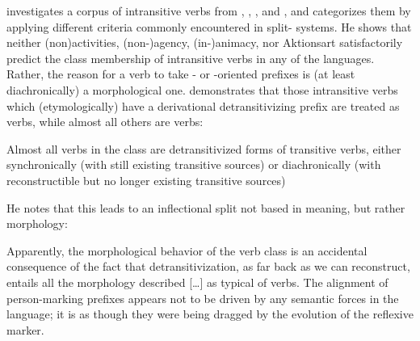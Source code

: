 \textcite{meira2000split} investigates a corpus of intransitive verbs from \trio, \kalina, \apalai, and \wayana, and categorizes them by applying different criteria commonly encountered in split- systems.
He shows that neither (non\-)activities, %
(non-)agency, %
(in-)animacy, %
nor Aktionsart %
satisfactorily predict the class membership of intransitive verbs in any of the languages.
Rather, the reason for a verb to take - or -oriented prefixes is (at least diachronically) a morphological one.
\textcite[217--221]{meira2000split} demonstrates that those intransitive verbs which (etymologically) have a derivational detransitivizing prefix are treated as  verbs, while almost all others are  verbs:
\begin{quotebox}{\parencite[201]{meira2000split}}
	Almost all verbs in the  class are detransitivized forms of transitive verbs, either synchronically (with still existing transitive sources) or diachronically (with reconstructible but no longer existing transitive sources)
\end{quotebox}
He notes that this leads to an inflectional split not based in meaning, but rather morphology:

\begin{quotebox}{\parencite[226]{meira2000split}}
	Apparently, the morphological behavior of the  verb class is an accidental consequence of the fact that detransitivization, as far back as we can reconstruct, entails all the morphology described […] as typical of  verbs. The alignment of person-marking prefixes appears not to be driven by any semantic forces in the language; it is as though they were being dragged by the evolution of the reflexive marker.
\end{quotebox}

